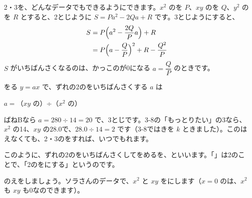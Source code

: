 2・3を、どんなデータでもできるようにできます。$x^2$ のを $P$、$xy$ のを $Q$、$y^2$ のを $R$ とすると、2とじように $S=Pa^2-2Qa+R$ です。3とじようにすると、
\begin{align*}
S&=P\Bigl(a^2-\frac{2Q}{P}a\Bigr)+R\\
&=P\Bigl(a-\frac{Q}{P}\Bigr)^2+R-\frac{Q^2}{P}
\end{align*}
$S$ がいちばんさくなるのは、かっこのが0になる $a=\dfrac{Q}{P}$ のときです。

\begin{taisetsu}
をる $y=ax$ で、ずれの2のをいちばんさくする $a$ は\par
\hfill $a=$（$xy$ の）÷（$x^2$ の）\hfill\null
\end{taisetsu}

ばねBなら $a=280\div14=20$ で、3とじです。3-8の「もっとりたい」の3なら、$x^2$ の14、$xy$ の28.0で、$28.0\div14=2$ です（3-8ではきを $k$ ときました）。このはえなくても、2・3のをすれば、いつでもれます。

このように、ずれの2のをいちばんさくしてをめるを、\textbf{}といいます。「」は2のことで、「2のをにする」というのです。

\bkhatenaref のえをしましょう。ソラさんのデータで、$x^2$ と $xy$ をにします（$x=0$ のは、$x^2$ も $xy$ も0なのできます）。

